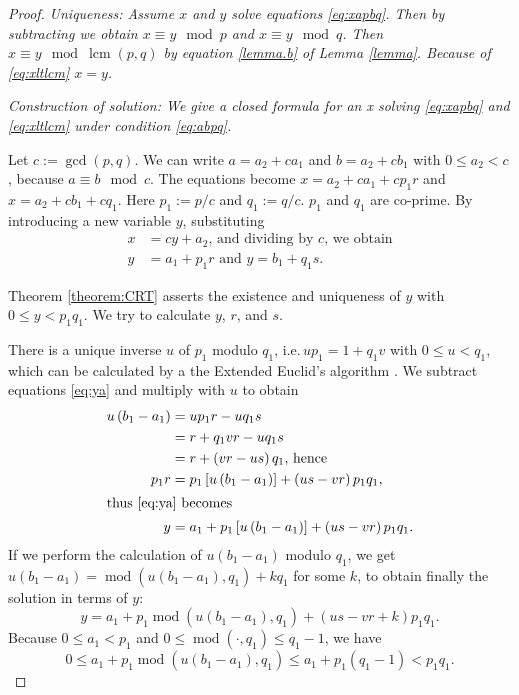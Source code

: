 \documentclass[12pt]{article}
\def\ie{i.e.\,}
\def\lt{<}
\def\coloneqq{:=}
\DeclareMathOperator*{\modf}{mod}
\DeclareMathOperator{\lcm}{lcm}
\begin{document}
\begin{proof}
 
	\em Uniqueness: \em Assume $x$ and $y$ solve equations \eqref{eq:xapbq}. Then by subtracting we obtain $x \equiv y \mod p$ and $x \equiv y \mod q$. Then $x \equiv y \mod \lcm\left(p, q\right)$ by equation \eqref{lemma.b} of Lemma \ref{lemma}. Because of \eqref{eq:xltlcm} $x = y$.
	
	
	 \em Construction of solution: \em We give a closed formula for an x  solving \eqref{eq:xapbq}  and  \eqref{eq:xltlcm} under condition \eqref{eq:abpq}.
	 
	 Let $c \coloneqq  \gcd\left(p, q\right)$. We can write $a = a_2 + c a_1$ and $b = a_2 + c b_1$ with $0 \le a_2 \lt c$, because $a \equiv b \mod c$. The equations become
	 $x = a_2 + c a_1 + c p_1 r$ and  $x = a_2 + c b_1 + c q_1$. Here $p_1 \coloneqq p / c$ and $q_1 \coloneqq q / c$. $p_1$ and $q_1$ are co-prime. By introducing a new variable $y$, substituting
	 \begin{align}
	 \label{eq:xy}x &= c y + a_2 \text{, and dividing by $c$, we obtain}\\
	 \label{eq:ya}y &= a_1 + p_1 r \text{ and } y = b_1 + q_1 s.
	 \end{align}
	 
	  Theorem \ref{theorem:CRT} asserts the existence and uniqueness of $y$ with $0 \le y \lt p_1 q_1$. We try to calculate $y$, $r$, and $s$.
	 
	 There is a unique inverse $u$ of $p_1$ modulo $q_1$, \ie $u p_1 = 1 + q_1 v$ with $0 \le u \lt q_1$, which can be calculated by a the Extended Euclid's algorithm \cite[ch.~4.5.2, Theorem X, ~p.342]{Knuth2}. We subtract equations \eqref{eq:ya} and multiply with $u$ to obtain
	 \begin{align*}
	 u \left(b_1 - a_1\right) &= u p_1 r - u q_1 s\\
	  &= r + q_1 v r - u q_1 s\\
	  &= r + \left(v r - u s\right) q_1 \text{, hence}\\
	 p_1 r &= p_1 \left[u \left(b_1 - a_1\right)\right] + \left(u s - v r\right) p_1 q_1,\\
	 \intertext{thus \eqref{eq:ya} becomes}
		y &= a_1 + p_1 \left[u \left(b_1 - a_1\right)\right] + \left(u s - v r\right) p_1 q_1.
	 \end{align*}
	 If we perform the calculation of $u \left(b_1 - a_1\right)$ modulo $q_1$, we get $u \left(b_1 - a_1\right) = \modf\left(u \left(b_1 - a_1\right), q_1\right) + k q_1$ for some $k$, to obtain finally the solution in terms of $y$:
	 \begin{equation*}
	 \label{eq:ysol}y = a_1 + p_1 \modf\left( u \left(b_1 - a_1\right), q_1\right) + \left(u s - v r + k\right) p_1 q_1.
	 \end{equation*}
	 Because $0 \le a_1 \lt p_1$ and $0 \le \modf\left(\cdot, q_1\right) \le q_1-1$, we have
	 \begin{equation*}
	 0 \le a_1 + p_1 \modf\left(u \left(b_1 - a_1\right), q_1\right) \le a_1 + p_1 \left(q_1 - 1\right) \lt p_1 q_1.
	 \end{equation*}
	  

\end{proof}
\end{document}
